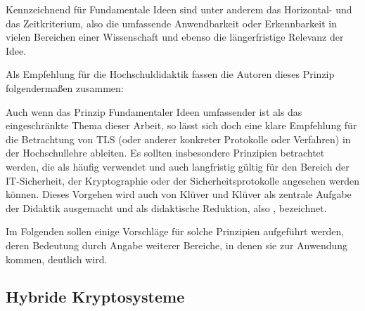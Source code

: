 Kennzeichnend für Fundamentale Ideen sind unter anderem das Horizontal- und das Zeitkriterium, also die umfassende Anwendbarkeit oder Erkennbarkeit in vielen Bereichen einer Wissenschaft und ebenso die längerfristige Relevanz der Idee. 

Als Empfehlung für die Hochschuldidaktik fassen die Autoren dieses Prinzip folgendermaßen zusammen:

\begin{quote}
 \cite{schubert11}
\end{quote}

Auch wenn das Prinzip Fundamentaler Ideen umfassender ist als das eingeschränkte Thema dieser Arbeit, so lässt sich doch eine klare Empfehlung für die Betrachtung von TLS (oder anderer konkreter Protokolle oder Verfahren) in der Hochschullehre ableiten. Es sollten  insbesondere Prinzipien betrachtet werden, die als häufig verwendet und auch langfristig gültig für den Bereich der IT-Sicherheit, der Kryptographie oder der Sicherheitsprotokolle angesehen werden können. 
Dieses Vorgehen wird auch von Klüver und Klüver als zentrale Aufgabe der Didaktik ausgemacht und als didaktische Reduktion, also  \cite{kluever12}, bezeichnet.

Im Folgenden sollen einige Vorschläge für solche Prinzipien aufgeführt werden, deren Bedeutung durch Angabe weiterer Bereiche, in denen sie zur Anwendung kommen, deutlich wird. 

\subsection{Hybride Kryptosysteme}

